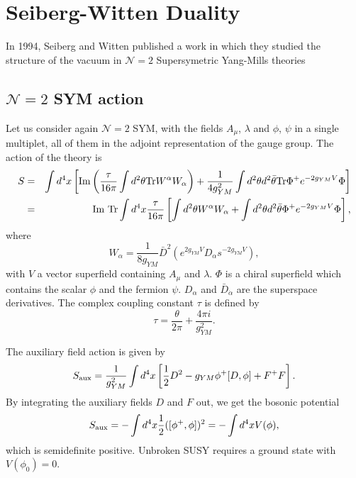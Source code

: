 \documentclass[12pt, onecolumn]{article}
\begin{document}
\section{Seiberg-Witten Duality}

In 1994, Seiberg and Witten published a work in which they studied  the structure of the vacuum in $\mathcal{N}=2$ Supersymetric Yang-Mills theories \cite{SW}

\subsection{$\mathcal{N}=2$ SYM action}


Let us consider again $\mathcal{N}=2$ SYM, with  the fields $A_\mu$, $\lambda$  and $\phi$, $\psi$ in a single multiplet, all of them in the adjoint representation of the gauge group. The action of the theory is 
\begin{eqnarray}
S&=&\int d^4x \left[ {\rm Im} \left( \frac{\tau}{16\pi}\int d^2\theta {\rm Tr} W^\alpha W_\alpha\right)+\frac{1}{4 g_{YM}^2}\int d^2\theta d^2 \bar{\theta} {\rm Tr} \Phi^+ e^{-2 g_{YM} V}\Phi \right] \nonumber \\
&=& {\rm Im\,\,Tr}\int d^4x \frac{\tau}{16\pi}\left[\int d^2\theta  W^\alpha W_\alpha + \int d^2\theta d^2 \bar{\theta}  \Phi^+ e^{-2 g_{YM} V}\Phi \right], \label{susy-action} 
\end{eqnarray}
where $$W_\alpha=\frac{1}{8g_{YM}}\bar{D}^2\left(e^{2g_{YM}V}D_\alpha s^{-2g_{YM}V}\right),$$ with $V$ a vector superfield containing $A_\mu$ and $\lambda$. $\Phi$ is a chiral superfield which contains the scalar $\phi$ and the fermion $\psi$. $D_\alpha$ and $\bar{D}_{\dot{\alpha}}$ are the superspace derivatives. The complex coupling constant $\tau$ is defined by
\begin{equation}
\tau = \frac{\theta}{2\pi}+\frac{4\pi i}{g_{YM}^2}.
\end{equation}

The auxiliary field action is given by 
\begin{equation}
S_{\rm aux}=\frac{1}{g_{YM}^2}\int d^4x \left[\frac{1}{2}D^2-g_{YM}\phi^+[D,\phi]+F^+F\right].
\end{equation}
By integrating the auxiliary fields $D$ and $F$ out, we get the bosonic potential 
\begin{equation}
S_{\rm aux}=-\int d^4x \frac{1}{2} ([\phi^+,\phi])^2=-\int d^4 x V(\phi),
\end{equation}
which is semidefinite positive. Unbroken SUSY requires a ground state with $V(\phi_0) =0$. 
\end{document}
